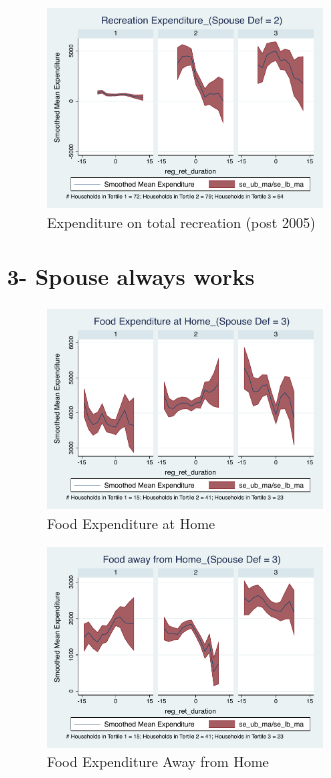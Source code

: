 \documentclass[11pt,onecolumn]{article}
\numberwithin{figure}{section}
\begin{document}
\begin{figure}[h]
	\caption{Expenditure on total recreation (post 2005)}
	\centering
	\includegraphics[width=0.65\textwidth]{../ConsumptionPostRetirement_by_SpouseDef_Cats/Smoothed/2/spouse_def_total_recreation_2005_real.pdf}
\end{figure}

\clearpage

\subsection{3- Spouse always works}

\begin{figure}[h]
	\caption{Food Expenditure at Home}
	\centering
	\includegraphics[width=0.65\textwidth]{../ConsumptionPostRetirement_by_SpouseDef_Cats/Smoothed/3/spouse_def_total_foodexp_home_real.pdf}
\end{figure}


\begin{figure}[h]
	\caption{Food Expenditure Away from Home}
	\centering
	\includegraphics[width=0.65\textwidth]{../ConsumptionPostRetirement_by_SpouseDef_Cats/Smoothed/3/spouse_def_total_foodexp_away_real.pdf}
\end{figure}
\end{document}
